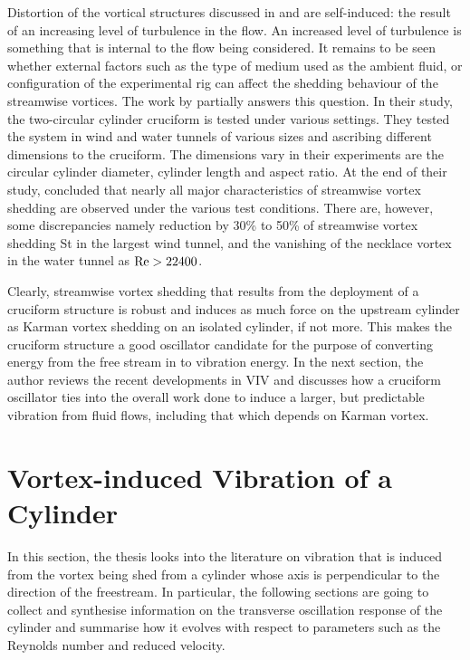 \documentclass[oneside]{utmthesis}
\begin{document}
Distortion of the vortical structures discussed in \citet{Kato2007} and \citet{Koide2017} are self-induced: the result of an increasing level of turbulence in the flow. An increased level of turbulence is something that is internal to the flow being considered. It remains to be seen whether external factors such as the type of medium used as the ambient fluid, or configuration of the experimental rig can affect the shedding behaviour of the streamwise vortices. The work by \citet{Nguyen2010} partially answers this question. In their study, the two-circular cylinder cruciform is tested under various settings. They tested the system in wind and water tunnels of various sizes and ascribing different dimensions to the cruciform. The dimensions \citet{Nguyen2010} vary in their experiments are the circular cylinder diameter, cylinder length and aspect ratio. At the end of their study, \citet{Nguyen2010} concluded that nearly all major characteristics of streamwise vortex shedding are observed under the various test conditions. There are, however, some discrepancies namely reduction by 30\% to 50\% of streamwise vortex shedding St in the largest wind tunnel, and the vanishing of the necklace vortex in the water tunnel as $\text{Re} > 22400$.

Clearly, streamwise vortex shedding that results from the deployment of a cruciform structure is robust and induces as much force on the upstream cylinder as Karman vortex shedding on an isolated cylinder, if not more. This makes the cruciform structure a good oscillator candidate for the purpose of converting energy from the free stream in to vibration energy. In the next section, the author reviews the recent developments in VIV and discusses how a cruciform oscillator ties into the overall work done to induce a larger, but predictable vibration from fluid flows, including that which depends on Karman vortex.

\section{Vortex-induced Vibration of a Cylinder} \label{sec:cylinderVIV}

\vspace{\baselineskip}

In this section, the thesis looks into the literature on vibration that is induced from the vortex being shed from a cylinder whose axis is perpendicular to the direction of the freestream. In particular, the following sections are going to collect and synthesise information on the transverse oscillation response of the cylinder and summarise how it evolves with respect to parameters such as the Reynolds number and reduced velocity.
\end{document}

